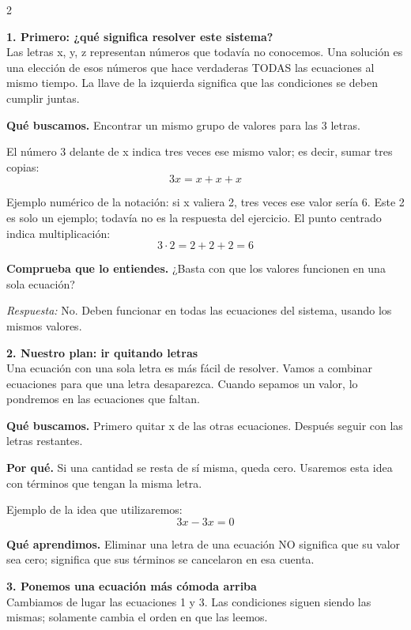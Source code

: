 \documentclass[11pt,a4paper,landscape]{article}
\begin{document}
\begin{multicols*}{2}
\noindent\begin{minipage}{\linewidth}\textbf{1. Primero: ¿qué significa resolver este sistema?}\\[2pt]Las letras x, y, z representan números que todavía no conocemos. Una solución es una elección de esos números que hace verdaderas TODAS las ecuaciones al mismo tiempo. La llave de la izquierda significa que las condiciones se deben cumplir juntas.
\par\smallskip\textbf{Qué buscamos.} Encontrar un mismo grupo de valores para las 3 letras.
\par\smallskip El número 3 delante de x indica tres veces ese mismo valor; es decir, sumar tres copias:
\[3x=x+x+x\]
\par\smallskip Ejemplo numérico de la notación: si x valiera 2, tres veces ese valor sería 6. Este 2 es solo un ejemplo; todavía no es la respuesta del ejercicio. El punto centrado indica multiplicación:
\[3\cdot 2=2+2+2=6\]
\par\smallskip\textbf{Comprueba que lo entiendes.} ¿Basta con que los valores funcionen en una sola ecuación?\par\textit{Respuesta:} No. Deben funcionar en todas las ecuaciones del sistema, usando los mismos valores.
\end{minipage}\par\medskip
\noindent\begin{minipage}{\linewidth}\textbf{2. Nuestro plan: ir quitando letras}\\[2pt]Una ecuación con una sola letra es más fácil de resolver. Vamos a combinar ecuaciones para que una letra desaparezca. Cuando sepamos un valor, lo pondremos en las ecuaciones que faltan.
\par\smallskip\textbf{Qué buscamos.} Primero quitar x de las otras ecuaciones. Después seguir con las letras restantes.
\par\smallskip\textbf{Por qué.} Si una cantidad se resta de sí misma, queda cero. Usaremos esta idea con términos que tengan la misma letra.
\par\smallskip Ejemplo de la idea que utilizaremos:
\[3x-3x=0\]
\par\smallskip\textbf{Qué aprendimos.} Eliminar una letra de una ecuación NO significa que su valor sea cero; significa que sus términos se cancelaron en esa cuenta.
\end{minipage}\par\medskip
\noindent\begin{minipage}{\linewidth}\textbf{3. Ponemos una ecuación más cómoda arriba}\\[2pt]Cambiamos de lugar las ecuaciones 1 y 3. Las condiciones siguen siendo las mismas; solamente cambia el orden en que las leemos.

\end{minipage}
\end{multicols*}
\end{document}
